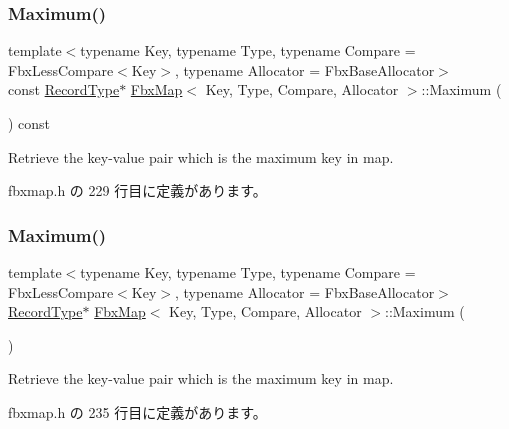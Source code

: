 \subsubsection{\texorpdfstring{Maximum()}{Maximum()}\hspace{0.1cm}{\footnotesize\ttfamily [1/2]}}
{\footnotesize\ttfamily template$<$typename Key, typename Type, typename Compare = Fbx\+Less\+Compare$<$\+Key$>$, typename Allocator = Fbx\+Base\+Allocator$>$ \\
const \hyperlink{class_fbx_map_af8fc887461b3bf29f41aa36d15ddb54f}{Record\+Type}$\ast$ \hyperlink{class_fbx_map}{Fbx\+Map}$<$ Key, Type, Compare, Allocator $>$\+::Maximum (\begin{DoxyParamCaption}{ }\end{DoxyParamCaption}) const\hspace{0.3cm}{\ttfamily [inline]}}



Retrieve the key-\/value pair which is the maximum key in map. 



 fbxmap.\+h の 229 行目に定義があります。

\mbox{\label{class_fbx_map_a05a712e0a43083d5397ecda3003d81e1}} 
\subsubsection{\texorpdfstring{Maximum()}{Maximum()}\hspace{0.1cm}{\footnotesize\ttfamily [2/2]}}
{\footnotesize\ttfamily template$<$typename Key, typename Type, typename Compare = Fbx\+Less\+Compare$<$\+Key$>$, typename Allocator = Fbx\+Base\+Allocator$>$ \\
\hyperlink{class_fbx_map_af8fc887461b3bf29f41aa36d15ddb54f}{Record\+Type}$\ast$ \hyperlink{class_fbx_map}{Fbx\+Map}$<$ Key, Type, Compare, Allocator $>$\+::Maximum (\begin{DoxyParamCaption}{ }\end{DoxyParamCaption})\hspace{0.3cm}{\ttfamily [inline]}}



Retrieve the key-\/value pair which is the maximum key in map. 



 fbxmap.\+h の 235 行目に定義があります。

\mbox{\label{class_fbx_map_a12efe88fe10227cf0aca2284a3474193}} 
